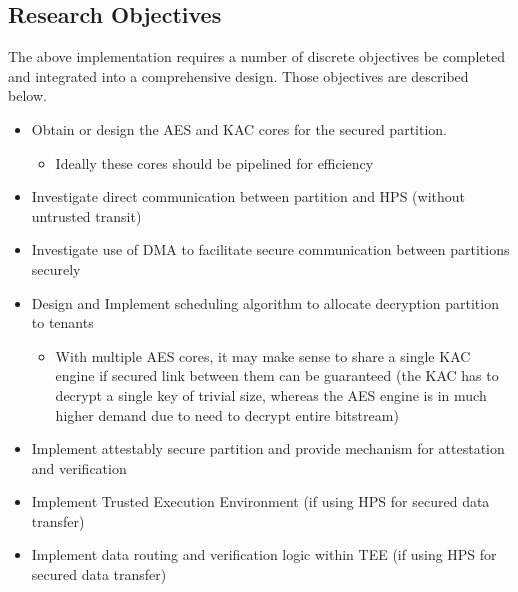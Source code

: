 \subsection{Research Objectives}\label{subsec:Obj}

The above implementation requires a number of discrete objectives be completed and integrated into a comprehensive design. Those objectives are described below.

\begin{itemize}
  \item Obtain or design the AES and KAC cores for the secured partition.
    \begin{itemize}  
      \item Ideally these cores should be pipelined for efficiency
    \end{itemize}
  \item Investigate direct communication between partition and HPS (without untrusted transit)
  \item Investigate use of DMA to facilitate secure communication between partitions securely
  \item Design and Implement scheduling algorithm to allocate decryption partition to tenants
    \begin{itemize}
      \item With multiple AES cores, it may make sense to share a single KAC engine if secured link between them can be guaranteed (the KAC has to decrypt a single key of trivial size, whereas the AES engine is in much higher demand due to need to decrypt entire bitstream)
    \end{itemize}
  \item Implement attestably secure partition and provide mechanism for attestation and verification
  \item Implement Trusted Execution Environment (if using HPS for secured data transfer)
  \item Implement data routing and verification logic within TEE (if using HPS for secured data transfer)
  \end{itemize}